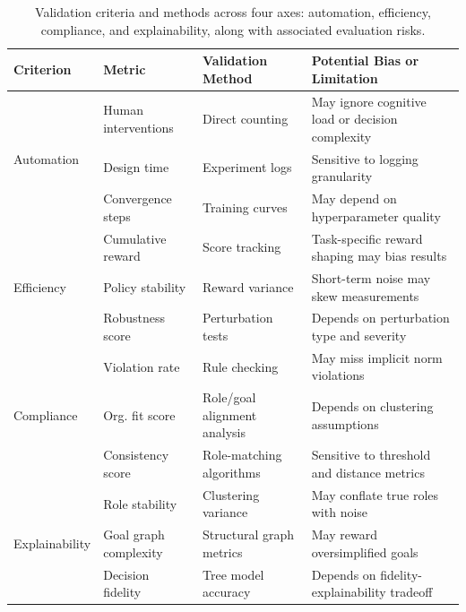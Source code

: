 \documentclass[pdflatex,sn-mathphys-num]{sn-jnl}%
\theoremstyle{thmstyleone}%
\theoremstyle{thmstyletwo}%
\theoremstyle{thmstylethree}%
\begin{document}
\begin{table}[h!]
    \centering
    \renewcommand{\arraystretch}{1.3}
    \begin{footnotesize}
        \begin{tabular}{p{1.5cm}p{2.4cm}p{2.2cm}p{4.5cm}}
            \hline
            \textbf{Criterion} & \textbf{Metric}       & \textbf{Validation Method}   & \textbf{Potential Bias or Limitation}            \\
            \hline
            \multirow{3}{*}{Automation}
                               & Human interventions   & Direct counting              & May ignore cognitive load or decision complexity \\
                               & Design time           & Experiment logs              & Sensitive to logging granularity                 \\
                               & Convergence steps     & Training curves              & May depend on hyperparameter quality             \\
            \hline
            \multirow{3}{*}{Efficiency}
                               & Cumulative reward     & Score tracking               & Task-specific reward shaping may bias results    \\
                               & Policy stability      & Reward variance              & Short-term noise may skew measurements           \\
                               & Robustness score      & Perturbation tests           & Depends on perturbation type and severity        \\
            \hline
            \multirow{3}{*}{Compliance}
                               & Violation rate        & Rule checking                & May miss implicit norm violations                \\
                               & Org. fit score        & Role/goal alignment analysis & Depends on clustering assumptions                \\
                               & Consistency score     & Role-matching algorithms     & Sensitive to threshold and distance metrics      \\
            \hline
            \multirow{3}{*}{Explainability}
                               & Role stability        & Clustering variance          & May conflate true roles with noise               \\
                               & Goal graph complexity & Structural graph metrics     & May reward oversimplified goals                  \\
                               & Decision fidelity     & Tree model accuracy          & Depends on fidelity-explainability tradeoff      \\
            \hline
        \end{tabular}
        \caption{Validation criteria and methods across four axes: automation, efficiency, compliance, and explainability, along with associated evaluation risks.}
        \label{tab:validation_strategy}
    \end{footnotesize}
\end{table}
\end{document}
